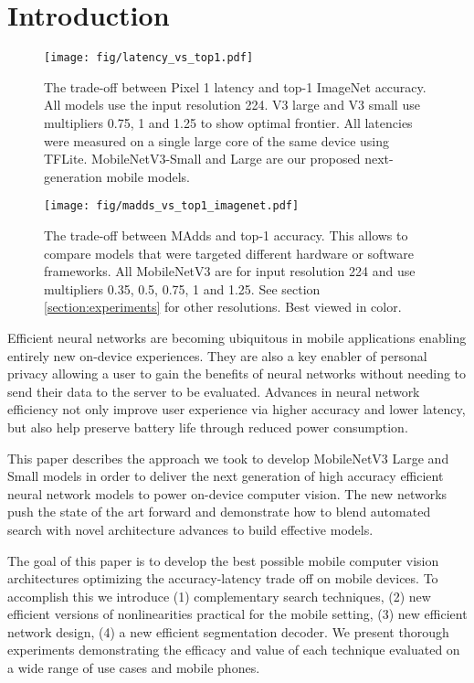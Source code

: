 \documentclass[10pt,twocolumn,letterpaper]{article}
\begin{document}
\section{Introduction}

\begin{figure}[!t]
    \centering
    \texttt{[image: fig/latency\_vs\_top1.pdf]}
    \caption{The trade-off between Pixel 1 latency and top-1 ImageNet accuracy. All models use the input resolution 224. V3 large and V3 small use multipliers 0.75, 1 and 1.25 to show optimal frontier. All latencies were measured on a single large core of the same device using TFLite\cite{tensorflow2015-whitepaper}. MobileNetV3-Small and Large are our proposed next-generation mobile models.}
    \label{fig:latency_vs_top_1}
\end{figure}
\begin{figure}[!t]
    \centering
    \texttt{[image: fig/madds\_vs\_top1\_imagenet.pdf]}
    \caption{The trade-off between MAdds and top-1 accuracy. This allows to compare models that were targeted different hardware or software frameworks. All MobileNetV3 are for input resolution 224 and use multipliers 0.35, 0.5, 0.75, 1 and 1.25. See section \ref{section:experiments} for other resolutions. Best viewed in color.}
    \label{fig:madds_vs_top_1}
\end{figure}

Efficient neural networks are becoming ubiquitous in mobile applications enabling entirely new on-device experiences. They are also a key enabler of personal privacy allowing a user to gain the benefits of neural networks without needing to send their data to the server to be evaluated. Advances in neural network efficiency not only improve user experience via higher accuracy and lower latency, but also help preserve battery life through reduced power consumption.

This paper describes the approach we took to develop MobileNetV3 Large and Small models in order to deliver the next generation of high accuracy efficient neural network models to power on-device computer vision. The new networks push the state of the art forward and demonstrate how to blend automated search with novel architecture advances to build effective models.

The goal of this paper is to develop the best possible mobile computer vision architectures optimizing the accuracy-latency trade off on mobile devices. To accomplish this we introduce (1) complementary search techniques, (2) new efficient versions of nonlinearities practical for the mobile setting, (3) new efficient network design, (4) a new efficient segmentation decoder. We present thorough experiments demonstrating the efficacy and value of each technique evaluated on a wide range of use cases and mobile phones.
\end{document}
